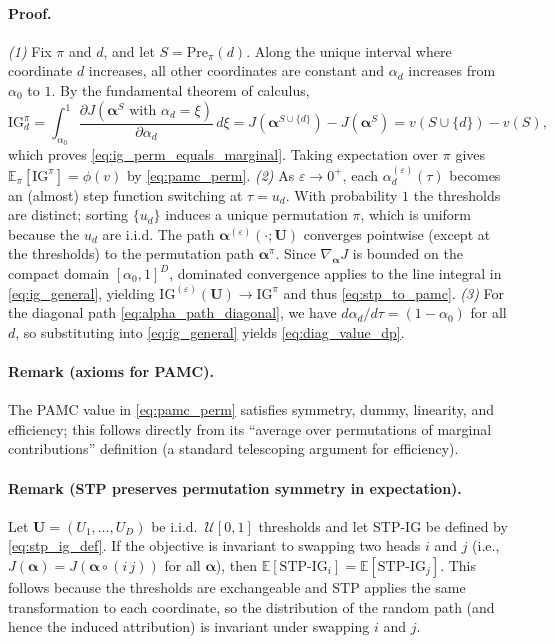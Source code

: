 \paragraph{Proof.}
\emph{(1)} Fix $\pi$ and $d$, and let $S=\mathrm{Pre}_{\pi}(d)$. Along the unique interval where coordinate $d$ increases, all other coordinates are constant and $\alpha_d$ increases from $\alpha_0$ to $1$. By the fundamental theorem of calculus,
\[
\mathrm{IG}^{\pi}_d
=
\int_{\alpha_0}^{1} \frac{\partial J(\boldsymbol{\alpha}^{S} \text{ with } \alpha_d=\xi)}{\partial \alpha_d}\, d\xi
=
J(\boldsymbol{\alpha}^{S\cup\{d\}})-J(\boldsymbol{\alpha}^{S})
=
v(S\cup\{d\})-v(S),
\]
which proves \eqref{eq:ig_perm_equals_marginal}. Taking expectation over $\pi$ gives $\mathbb{E}_{\pi}[\mathrm{IG}^{\pi}] = \phi(v)$ by \eqref{eq:pamc_perm}.
\emph{(2)} As $\varepsilon\to 0^+$, each $\alpha^{(\varepsilon)}_d(\tau)$ becomes an (almost) step function switching at $\tau=u_d$. With probability $1$ the thresholds are distinct; sorting $\{u_d\}$ induces a unique permutation $\pi$, which is uniform because the $u_d$ are i.i.d. The path $\boldsymbol{\alpha}^{(\varepsilon)}(\cdot;\mathbf{U})$ converges pointwise (except at the thresholds) to the permutation path $\boldsymbol{\alpha}^{\pi}$. Since $\nabla_{\boldsymbol{\alpha}}J$ is bounded on the compact domain $[\alpha_0,1]^D$, dominated convergence applies to the line integral in \eqref{eq:ig_general}, yielding $\mathrm{IG}^{(\varepsilon)}(\mathbf{U})\to \mathrm{IG}^{\pi}$ and thus \eqref{eq:stp_to_pamc}.
\emph{(3)} For the diagonal path \eqref{eq:alpha_path_diagonal}, we have $d\alpha_d/d\tau=(1-\alpha_0)$ for all $d$, so substituting into \eqref{eq:ig_general} yields \eqref{eq:diag_value_dp}.

\paragraph{Remark (axioms for PAMC).}
The PAMC value in \eqref{eq:pamc_perm} satisfies symmetry, dummy, linearity, and efficiency; this follows directly from its ``average over permutations of marginal contributions'' definition (a standard telescoping argument for efficiency).

\paragraph{Remark (STP preserves permutation symmetry in expectation).}
Let $\mathbf{U}=(U_1,\dots,U_D)$ be i.i.d.\ $\mathcal{U}[0,1]$ thresholds and let $\mathrm{STP}\text{-}\mathrm{IG}$ be defined by \eqref{eq:stp_ig_def}.
If the objective is invariant to swapping two heads $i$ and $j$ (i.e., $J(\boldsymbol{\alpha})=J(\boldsymbol{\alpha}\circ (i\,j))$ for all $\boldsymbol{\alpha}$), then $\mathbb{E}[\mathrm{STP}\text{-}\mathrm{IG}_i] = \mathbb{E}[\mathrm{STP}\text{-}\mathrm{IG}_j]$.
This follows because the thresholds are exchangeable and STP applies the same transformation to each coordinate, so the distribution of the random path (and hence the induced attribution) is invariant under swapping $i$ and $j$.

